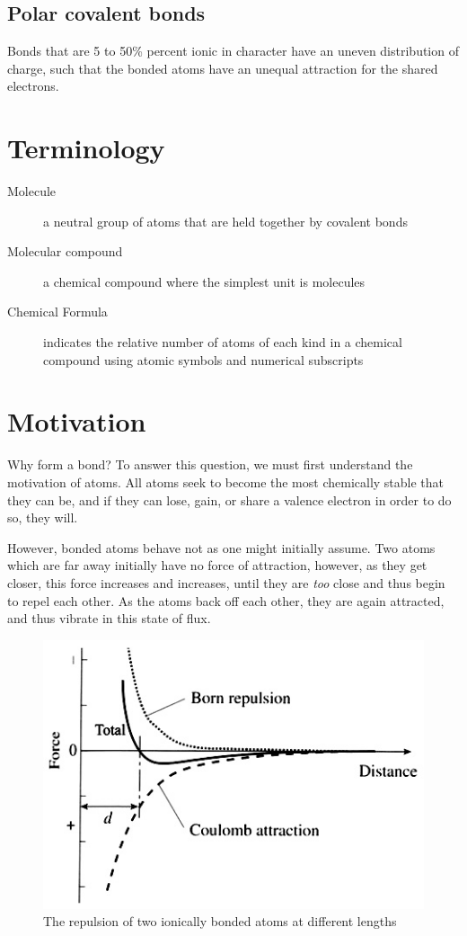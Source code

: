 \subsection{Polar covalent bonds}
Bonds that are 5 to 50\% percent ionic in character have an uneven distribution
of charge, such that the bonded atoms have an unequal attraction for the shared
electrons.

\section{Terminology}
\begin{description}
  \item[Molecule] a neutral group of atoms that are held together by covalent
    bonds
  \item[Molecular compound] a chemical compound where the simplest unit is
    molecules
  \item[Chemical Formula] indicates the relative number of atoms of each kind in
    a chemical compound using atomic symbols and numerical subscripts
\end{description}

\section{Motivation}
Why form a bond?  To answer this question, we must first understand the
motivation of atoms.  All atoms seek to become the most chemically stable that
they can be, and if they can lose, gain, or share a valence electron in order to
do so, they will.

However, bonded atoms behave not as one might initially assume.  Two atoms which
are far away initially have no force of attraction, however, as they get closer,
this force increases and increases, until they are \textit{too} close and thus
begin to repel each other.  As the atoms back off each other, they are again
attracted, and thus vibrate in this state of flux.

\begin{figure}[H]
  \centering
  \includegraphics{res/ionic_bond_length.jpg}
  \caption{The repulsion of two ionically bonded atoms at different lengths}
\end{figure}

